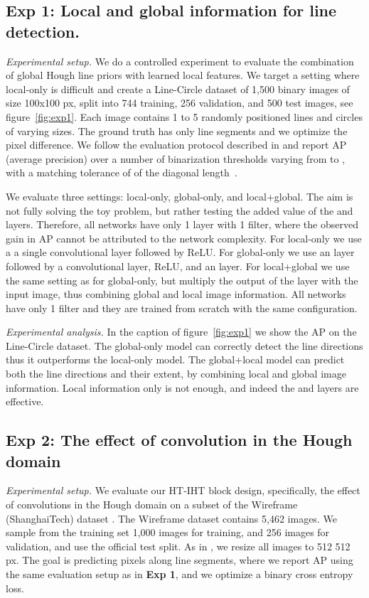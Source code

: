 \documentclass[runningheads]{llncs}
\newcommand{\model}{HT-IHT block\xspace}
\begin{document}
\subsection{\textbf{Exp 1:}  Local and global information for line detection.}
\label{exp1}
\noindent\emph{Experimental setup.} 
We do a controlled experiment to evaluate the combination of global Hough line priors with learned local features. We target a setting where local-only is difficult and create a Line-Circle dataset of 1,500 binary images of size 100x100 px, split into 744 training, 256 validation, and 500 test images, see figure~\ref{fig:exp1}.
Each image contains 1 to 5 randomly positioned lines and circles of varying sizes. 
The ground truth has only line segments and we optimize the  pixel difference.
We follow the evaluation protocol described in \cite{huang2018learning,martin2004learning,maire2008using} and report AP (average precision) over a number of binarization thresholds varying from  to , with a matching tolerance of  of the diagonal length~\cite{martin2004learning}.

We evaluate three settings: local-only, global-only, and local+global. 
The aim is not fully solving the toy problem, but rather testing the added value of the  and  layers. Therefore, all networks have only 1  layer with 1 filter, where the observed gain in AP cannot be attributed to the network complexity. 
For local-only we use a a single  convolutional layer followed by ReLU. For global-only we use an  layer followed by a  convolutional layer, ReLU, and an  layer. For local+global we use the same setting as for global-only, but multiply the output of the  layer with the input image, thus combining global and local image information.
All networks have only 1 filter and they are trained from scratch with the same configuration.

\noindent\emph{Experimental analysis.} 
In the caption of figure~\ref{fig:exp1} we show the AP on the Line-Circle dataset.
The global-only model can correctly detect the line directions thus it outperforms the local-only model.
The global+local model can predict both the line directions and their extent, by combining local and global image information. Local information only is not enough, and indeed the  and  layers are effective.

\subsection{\textbf{Exp 2:} The effect of convolution in the Hough domain}
\label{exp2}
\noindent\emph{Experimental setup.}
We evaluate our \model design, specifically, the effect of convolutions in the Hough domain on a subset of the Wireframe (ShanghaiTech) dataset \cite{huang2018learning}.
The Wireframe dataset contains 5,462 images. We sample from the training set 1,000 images for training, and 256 images for validation, and use the official test split.
As in \cite{zhou2019learning}, we resize all images to 512  512 px.
The goal is predicting pixels along line segments, where we report AP using the same evaluation setup as in \textbf{Exp 1}, and we optimize a binary cross entropy loss.
\end{document}
